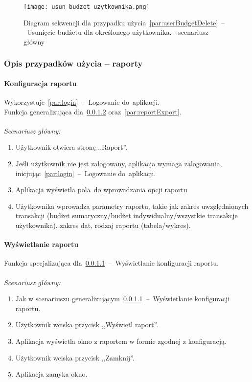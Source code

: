 \begin{figure}[H]
    \texttt{[image: usun\_budzet\_uzytkownika.png]}
    \caption{Diagram sekwencji dla przypadku użycia~\ref{par:userBudgetDelete}~--~Usunięcie budżetu dla określonego użytkownika.
    - scenariusz główny}
\end{figure}

\subsubsection{Opis przypadków użycia -- raporty}
\paragraph{Konfiguracja raportu\newline}
\label{par:reportConfig}
Wykorzystuje~\ref{par:login}~--~Logowanie do~aplikacji.\\
\indent Funkcja generalizująca dla~\ref{par:reportView} oraz~\ref{par:reportExport}.\\\\
\textit{Scenariusz główny:}
\begin{enumerate}
  \item Użytkownik otwiera stronę ,,Raport''.
  \item Jeśli użytkownik nie jest zalogowany, aplikacja wymaga zalogowania, inicjując~\ref{par:login}~--~Logowanie do~aplikacji.
  \item Aplikacja wyświetla pola~do wprowadzania opcji raportu
  \item Użytkownika wprowadza parametry raportu, takie jak zakres uwzględnionych transakcji (budżet sumaryczny/budżet indywidualny/wszystkie transakcje użytkownika), zakres dat, rodzaj raportu (tabela/wykres).
\end{enumerate}

\paragraph{Wyświetlanie raportu\newline}
\label{par:reportView}
\indent Funkcja specjalizująca dla~\ref{par:reportConfig}~--~Wyświetlanie konfiguracji raportu.\\\\
\textit{Scenariusz główny:}
\begin{enumerate}
  \item[1-4.] Jak w scenariuszu generalizującym~\ref{par:reportConfig}~--~Wyświetlanie konfiguracji raportu.
  \item[5.] Użytkownik wciska przycisk ,,Wyświetl raport''.
  \item[6.] Aplikacja wyświetla okno z raportem w formie zgodnej z konfiguracją.
  \item[7.] Użytkownik wciska przycisk ,,Zamknij''.
  \item[8.] Aplikacja zamyka okno.
\end{enumerate}

